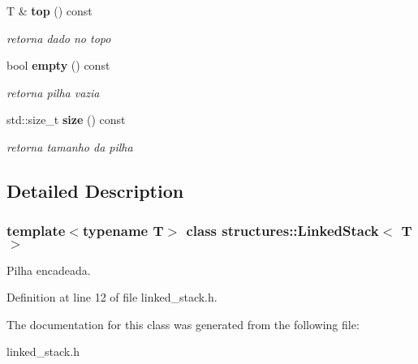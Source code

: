 \begin{DoxyCompactItemize}
\mbox{\label{classstructures_1_1_linked_stack_a14ab6e3507dd1206a87bba8c57e1733f}} 
T \& \textbf{ top} () const
\begin{DoxyCompactList}\small\item\em retorna dado no topo \end{DoxyCompactList}\item 
\mbox{\label{classstructures_1_1_linked_stack_ac9704fd697f9c4ed4f7fc4e786114e4f}} 
bool \textbf{ empty} () const
\begin{DoxyCompactList}\small\item\em retorna pilha vazia \end{DoxyCompactList}\item 
\mbox{\label{classstructures_1_1_linked_stack_ae1ca6a5a9b837471863f1c8bb23cfe1d}} 
std\+::size\+\_\+t \textbf{ size} () const
\begin{DoxyCompactList}\small\item\em retorna tamanho da pilha \end{DoxyCompactList}\end{DoxyCompactItemize}


\subsection{Detailed Description}
\subsubsection*{template$<$typename T$>$\newline
class structures\+::\+Linked\+Stack$<$ T $>$}

Pilha encadeada. 

Definition at line 12 of file linked\+\_\+stack.\+h.



The documentation for this class was generated from the following file\+:\begin{DoxyCompactItemize}
\item 
linked\+\_\+stack.\+h\end{DoxyCompactItemize}
